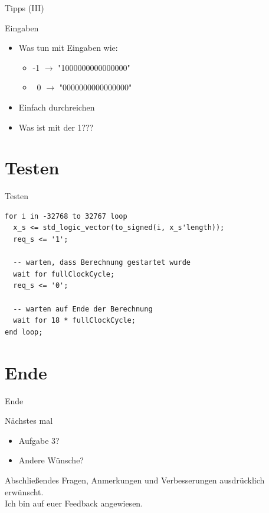   \begin{frame} {Tipps (III)}
    \begin{block} {Eingaben}
      \begin{itemize}
        \item Was tun mit Eingaben wie:
        \begin{itemize}
          \item -1 $\rightarrow$ "1000000000000000"
          \item ~0 $\rightarrow$ "0000000000000000"
        \end{itemize}
        \pause
        \item[] Einfach durchreichen
        \item Was ist mit der 1??? 
      \end{itemize}	
    \end{block}
  \end{frame}


  \section{Testen}
  \begin{frame} [fragile] {Testen}
    \begin{lstlisting}
for i in -32768 to 32767 loop
  x_s <= std_logic_vector(to_signed(i, x_s'length));
  req_s <= '1'; 

  -- warten, dass Berechnung gestartet wurde
  wait for fullClockCycle;
  req_s <= '0';

  -- warten auf Ende der Berechnung
  wait for 18 * fullClockCycle;
end loop;
    \end{lstlisting}
  \end{frame}

  \section{Ende}
  \begin{frame} {Ende}
    \begin{block} {Nächstes mal}
      \begin{itemize}
        \item Aufgabe 3?
        \item Andere Wünsche?
      \end{itemize}
    \end{block}
    \begin{exampleblock}{Abschließendes}
      Fragen, Anmerkungen und Verbesserungen ausdrücklich erwünscht.\\
      Ich bin auf euer Feedback angewiesen.
    \end{exampleblock}
  \end{frame}

